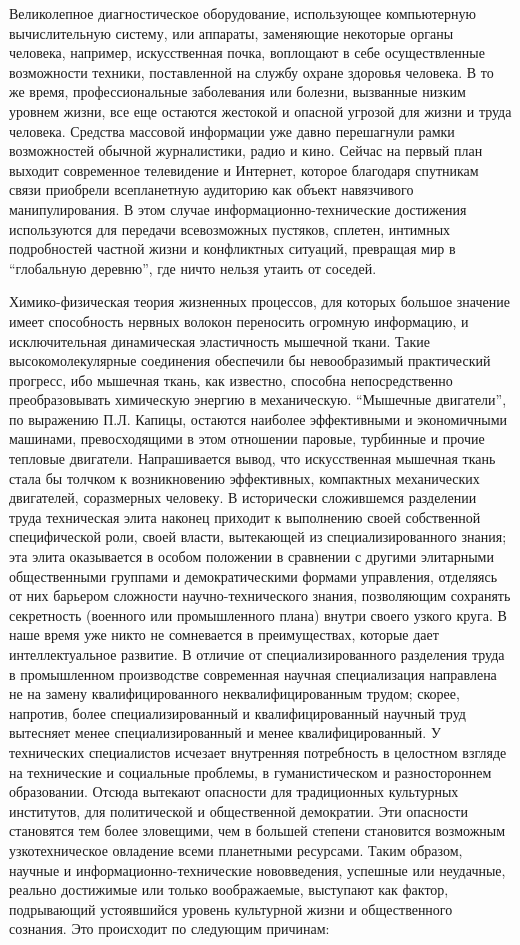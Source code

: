 Великолепное диагностическое оборудование, использующее компьютерную вычислительную систему, или аппараты, заменяющие некоторые органы человека, например, искусственная почка, воплощают в себе осуществленные возможности техники, поставленной на службу охране здоровья человека. В то же время, профессиональные заболевания или болезни, вызванные низким уровнем жизни, все еще остаются жестокой и опасной угрозой для жизни и труда человека.  Средства массовой информации уже давно перешагнули рамки возможностей обычной журналистики, радио и кино. Сейчас на первый план выходит современное телевидение и Интернет, которое благодаря спутникам связи приобрели всепланетную аудиторию как объект навязчивого манипулирования. В этом случае информационно-технические достижения используются для передачи всевозможных пустяков, сплетен, интимных подробностей частной жизни и конфликтных ситуаций, превращая мир в ``глобальную деревню'', где ничто нельзя утаить от соседей.

Химико-физическая теория жизненных процессов, для которых большое значение имеет способность нервных волокон переносить огромную информацию, и исключительная динамическая эластичность мышечной ткани. Такие высокомолекулярные соединения обеспечили бы невообразимый практический прогресс, ибо мышечная ткань, как известно, способна непосредственно преобразовывать химическую энергию в механическую. ``Мышечные двигатели'', по выражению П.Л. Капицы, остаются наиболее эффективными и экономичными машинами, превосходящими в этом отношении паровые, турбинные и прочие тепловые двигатели. Напрашивается вывод, что искусственная мышечная ткань стала бы толчком к возникновению эффективных, компактных механических двигателей, соразмерных человеку.  В исторически сложившемся разделении труда техническая элита наконец приходит к выполнению своей собственной специфической роли, своей власти, вытекающей из специализированного знания; эта элита оказывается в особом положении в сравнении с другими элитарными общественными группами и демократическими формами управления, отделяясь от них барьером сложности научно-технического знания, позволяющим сохранять секретность (военного или промышленного плана) внутри своего узкого круга. В наше время уже никто не сомневается в преимуществах, которые дает интеллектуальное развитие. В отличие от специализированного разделения труда в промышленном производстве современная научная специализация направлена не на замену квалифицированного неквалифицированным трудом; скорее, напротив, более специализированный и квалифицированный научный труд вытесняет менее специализированный и менее квалифицированный. У технических специалистов исчезает внутренняя потребность в целостном взгляде на технические и социальные проблемы, в гуманистическом и разностороннем образовании. Отсюда вытекают опасности для традиционных культурных институтов, для политической и общественной демократии. Эти опасности становятся тем более зловещими, чем в большей степени становится возможным узкотехническое овладение всеми планетными ресурсами.  Таким образом, научные и информационно-технические нововведения, успешные или неудачные, реально достижимые или только воображаемые, выступают как фактор, подрывающий устоявшийся уровень культурной жизни и общественного сознания. Это происходит по следующим причинам:

